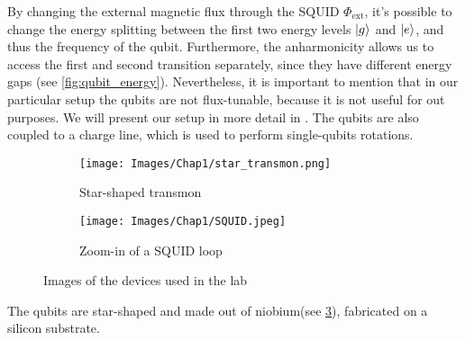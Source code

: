 By changing the external magnetic flux through the SQUID $\Phi_\text{ext}$, it's possible to change the energy splitting between the first two energy levels $\ket{g}$ and $\ket{e}$, and thus the frequency of the qubit.
Furthermore, the anharmonicity allows us to access the first and second transition separately, since they have different energy gaps (see \cref{fig:qubit_energy}).
Nevertheless, it is important to mention that in our particular setup the qubits are not flux-tunable, because it is not useful for out purposes.
We will present our setup in more detail in .
The qubits are also coupled to a charge line, which is used to perform single-qubits rotations.
\begin{figure}[t]
    \centering
    \begin{subfigure}[b]{0.45\linewidth}
      \centering
      \texttt{[image: Images/Chap1/star\_transmon.png]}
      \caption{Star-shaped transmon}
      \label{fig:stqr_transmon}
    \end{subfigure}
    \hfill
    \begin{subfigure}[b]{0.45\linewidth}
      \centering
      \texttt{[image: Images/Chap1/SQUID.jpeg]}
      \caption{Zoom-in of a SQUID loop}
      \label{fig:squid_loop}
    \end{subfigure}
    \caption{Images of the devices used in the lab}
    \label{fig:transmon_squid_images}
  \end{figure}

The qubits are star-shaped and made out of niobium(see \cref{fig:transmon_squid_images}), fabricated on a silicon substrate.
